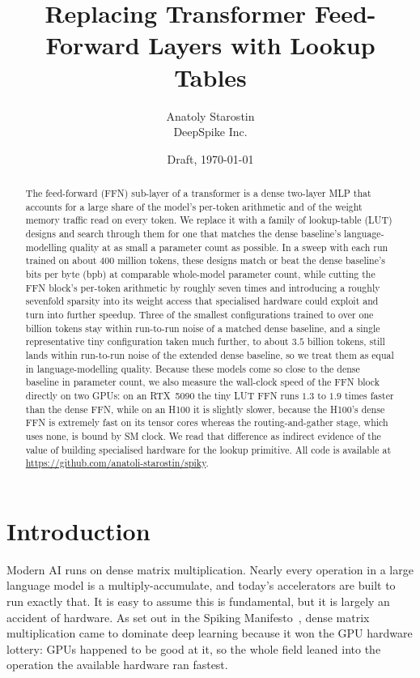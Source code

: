 \documentclass[11pt]{article}
\title{\vspace{-1.2cm}\textbf{Replacing Transformer Feed-Forward Layers with Lookup Tables}}
\author{Anatoly Starostin \\ DeepSpike Inc.}
\date{Draft, \today}
\begin{document}
\maketitle
\vspace{-0.8cm}

\begin{abstract}
\noindent The feed-forward (FFN) sub-layer of a transformer is a dense two-layer MLP that accounts
for a large share of the model's per-token arithmetic and of the weight memory traffic read on
every token. We replace it with a family of lookup-table (LUT) designs and search through them for one that
matches the dense baseline's language-modelling quality at as small a parameter count as possible. In a sweep with each run
trained on about $400$ million tokens, these designs match or beat the dense baseline's bits per byte (bpb) at
comparable whole-model parameter count, while cutting the FFN block's per-token arithmetic by
roughly seven times and introducing a roughly sevenfold sparsity into its weight access that specialised
hardware could exploit and turn into further speedup. Three of the smallest configurations trained to
over one billion tokens stay within run-to-run noise of a matched dense
baseline, and a single representative tiny configuration taken much further, to about $3.5$ billion
tokens, still lands within run-to-run noise of the extended dense baseline,
so we treat them as equal in language-modelling quality. Because these models come so
close to the dense baseline in parameter count, we also measure the wall-clock speed of the FFN block directly on two GPUs: on an RTX~5090 the tiny LUT FFN runs $1.3$ to
$1.9$ times faster than the dense FFN, while on an H100 it is slightly slower,
because the H100's dense FFN is extremely fast on its tensor cores whereas the routing-and-gather
stage, which uses none, is bound by SM clock. We read that difference as indirect
evidence of the value of building specialised hardware for the lookup primitive. All
code is available at \url{https://github.com/anatoli-starostin/spiky}.
\end{abstract}

\section{Introduction}

Modern AI runs on dense matrix multiplication. Nearly every operation in a large language model is
a multiply-accumulate, and today's accelerators are built to run exactly that. It is easy to assume
this is fundamental, but it is largely an accident of hardware. As set out in the Spiking
Manifesto~\cite{manifesto}, dense matrix multiplication came to dominate deep learning because it
won the GPU hardware lottery: GPUs happened to be good at it, so the whole field leaned into the
operation the available hardware ran fastest.
\end{document}
